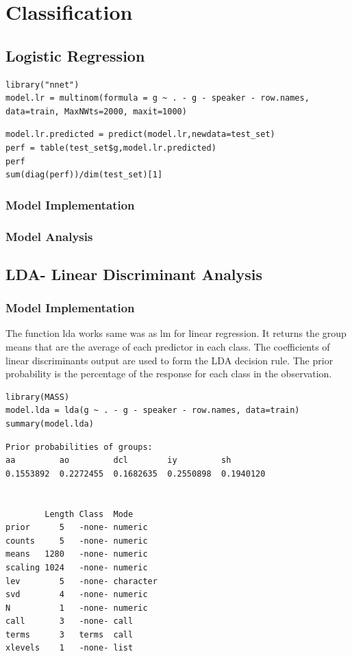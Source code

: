 \documentclass[]{report}
\begin{document}
\section{Classification}
\subsection{Logistic Regression}
\begin{lstlisting}
library("nnet")
model.lr = multinom(formula = g ~ . - g - speaker - row.names, data=train, MaxNWts=2000, maxit=1000)
\end{lstlisting}

\begin{lstlisting}
model.lr.predicted = predict(model.lr,newdata=test_set)
perf = table(test_set$g,model.lr.predicted)
perf
sum(diag(perf))/dim(test_set)[1]
\end{lstlisting}
\subsubsection{Model Implementation}
\subsubsection{Model Analysis}


\subsection{LDA- Linear Discriminant Analysis}

\subsubsection{Model Implementation}
The function lda works same was as lm for linear regression. It returns the group means that are the average of each predictor in each class. The coefficients of linear discriminants output are used to form the LDA decision rule. The prior probability is the percentage of the response for each class in the observation.

\begin{lstlisting}
library(MASS)
model.lda = lda(g ~ . - g - speaker - row.names, data=train)
summary(model.lda)
\end{lstlisting}

\begin{verbatim}
Prior probabilities of groups:
aa         ao         dcl        iy         sh 
0.1553892  0.2272455  0.1682635  0.2550898  0.1940120 


        Length Class  Mode     
prior      5   -none- numeric  
counts     5   -none- numeric  
means   1280   -none- numeric  
scaling 1024   -none- numeric  
lev        5   -none- character
svd        4   -none- numeric  
N          1   -none- numeric  
call       3   -none- call     
terms      3   terms  call     
xlevels    1   -none- list
\end{verbatim}
\end{document}
